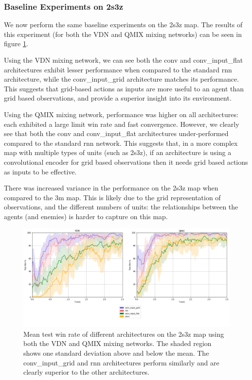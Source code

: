 \subsubsection{Baseline Experiments on 2s3z}
We now perform the same baseline experiments on the 2s3z map. The results of this experiment (for both the VDN and QMIX mixing networks) can be seen in figure \ref{fig:2s3z_all}.

Using the VDN mixing network, we can see both the conv and conv\_input\_flat architectures exhibit lesser performance when compared to the standard rnn architecture, while the conv\_input\_grid architecture matches its performance. This suggests that grid-based actions as inputs are more useful to an agent than grid based observations, and provide a superior insight into its environment.


Using the QMIX mixing network, performance was higher on all architectures: each exhibited a large limit win rate and fast convergence. However, we clearly see that both the conv and conv\_input\_flat architectures under-performed compared to the standard rnn network. This suggests that, in a more complex map with multiple types of units (such as 2s3z), if an architecture is using a convolutional encoder for grid based observations then it needs grid based actions as inputs to be effective. 

There was increased variance in the performance on the 2s3z map when compared to the 3m map. This is likely due to the grid representation of observations, and the different numbers of units: the relationships between the agents (and enemies) is harder to capture on this map.

\begin{figure}[h]
    \centering
    \hbox{\hspace{-6.35em}\includegraphics[width=1.34\textwidth]{images/graphs/all2s3z.png}}
    \caption{Mean test win rate of different architectures on the 2s3z map using both the VDN and QMIX mixing networks. The shaded region shows one standard deviation above and below the mean. The conv\_input\_grid and rnn architectures perform similarly and are clearly superior to the other architectures.}
    \label{fig:2s3z_all}
\end{figure}





